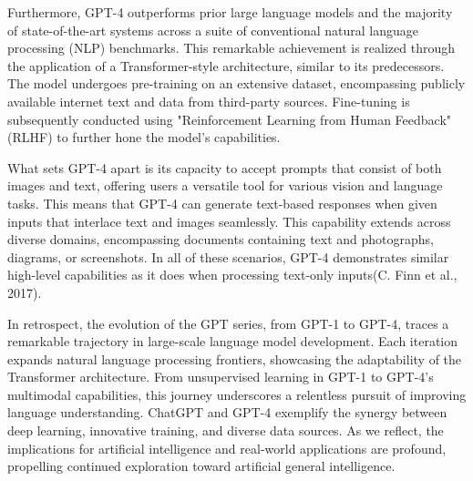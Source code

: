 \documentclass[fleqn,10pt]{thescipub} %
\begin{document}
Furthermore, GPT-4 outperforms prior large language models and the majority of state-of-the-art systems across a suite of conventional natural language processing (NLP) benchmarks. This remarkable achievement is realized through the application of a Transformer-style architecture, similar to its predecessors. The model undergoes pre-training on an extensive dataset, encompassing publicly available internet text and data from third-party sources. Fine-tuning is subsequently conducted using "Reinforcement Learning from Human Feedback" (RLHF) to further hone the model's capabilities.

What sets GPT-4 apart is its capacity to accept prompts that consist of both images and text, offering users a versatile tool for various vision and language tasks. This means that GPT-4 can generate text-based responses when given inputs that interlace text and images seamlessly. This capability extends across diverse domains, encompassing documents containing text and photographs, diagrams, or screenshots. In all of these scenarios, GPT-4 demonstrates similar high-level capabilities as it does when processing text-only inputs(C. Finn et al., 2017).

In retrospect, the evolution of the GPT series, from GPT-1 to GPT-4, traces a remarkable trajectory in large-scale language model development. Each iteration expands natural language processing frontiers, showcasing the adaptability of the Transformer architecture. From unsupervised learning in GPT-1 to GPT-4's multimodal capabilities, this journey underscores a relentless pursuit of improving language understanding. ChatGPT and GPT-4 exemplify the synergy between deep learning, innovative training, and diverse data sources. As we reflect, the implications for artificial intelligence and real-world applications are profound, propelling continued exploration toward artificial general intelligence.
\end{document}
